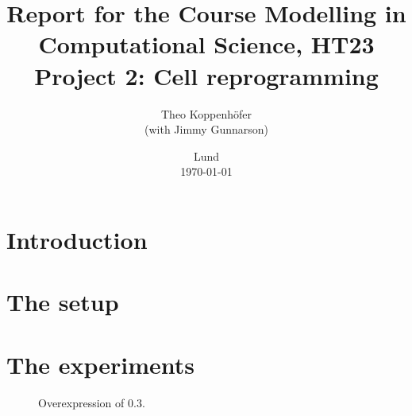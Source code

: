 




\title{ Report for the Course Modelling in Computational Science, HT23 \\[1ex]
	  \large Project 2: Cell reprogramming}
\author{Theo Koppenhöfer \\[1ex] (with Jimmy Gunnarson)}
\date{Lund \\[1ex] \today}



\usepackage{pythonhighlight}
\usepackage{pgfplots}
\graphicspath{{../Plots/}}






\maketitle

\section{Introduction}

\section{The setup}

\section{The experiments}

\begin{figure}
\centering
\begin{minipage}[t]{0.3\textwidth}
\centering
\graphicspath{{../Plots/}}

\end{minipage}
\hfill
\begin{minipage}[t]{0.3\textwidth}
\centering
\graphicspath{{../Plots/}}

\end{minipage}
\hspace*{0.2cm}
\begin{minipage}[t]{0.3\textwidth}
\centering
\graphicspath{{../Plots/}}

\end{minipage}
\caption{Overexpression of $0.3$.}
\label{pl:NOT_0.3}
\end{figure}

